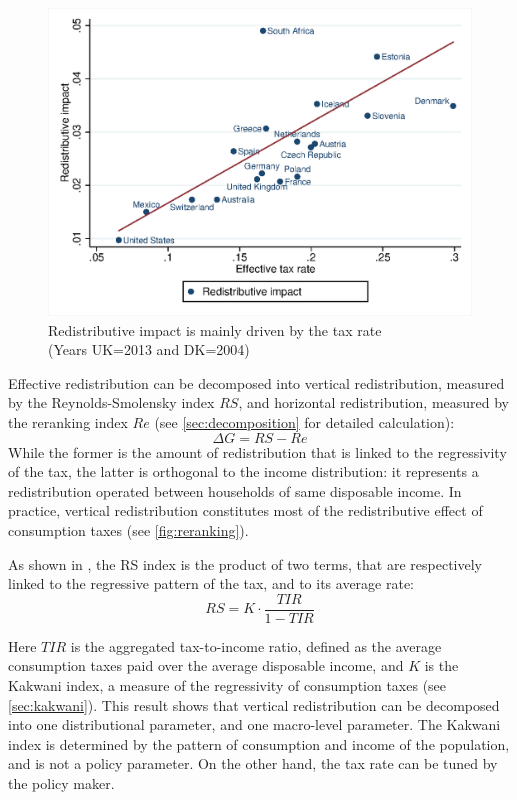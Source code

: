 \documentclass[12pt]{article}
\begin{document}
\begin{figure}
		\centering
    \includegraphics{images/19-02_redistribution_itrc}
    \caption{Redistributive impact is mainly driven by the tax rate \\ (Years UK=2013 and DK=2004)}
    \label{fig:redis_itrc}
\end{figure}

Effective redistribution can be decomposed into vertical redistribution, measured by the Reynolds-Smolensky index $RS$, and horizontal redistribution, measured by the reranking index $Re$ (see \cref{sec:decomposition} for detailed calculation):
\[ \Delta G = RS-Re \]
While the former is the amount of redistribution that is linked to the regressivity of the tax, the latter is orthogonal to the income distribution: it represents a redistribution operated between households of same disposable income. In practice, vertical redistribution constitutes most of the redistributive effect of consumption taxes (see \cref{fig:reranking}).

As shown in \cite{kakwani1977measurement}, the RS index is the product of two terms, that are respectively linked to the regressive pattern of the tax, and to its average rate:
\begin{equation}
    \label{equ:decomp_RS}
    RS = K \cdot \frac{TIR}{1-TIR} 
\end{equation} 

Here $TIR$ is the aggregated tax-to-income ratio, defined as the average consumption taxes paid over the average disposable income, and $K$ is the Kakwani index, a measure of the regressivity of consumption taxes (see \cref{sec:kakwani}). This result shows that vertical redistribution can be decomposed into one distributional parameter, and one macro-level parameter. The Kakwani index is determined by the pattern of consumption and income of the population, and is not a policy parameter. On the other hand, the tax rate can be tuned by the policy maker.
\end{document}
